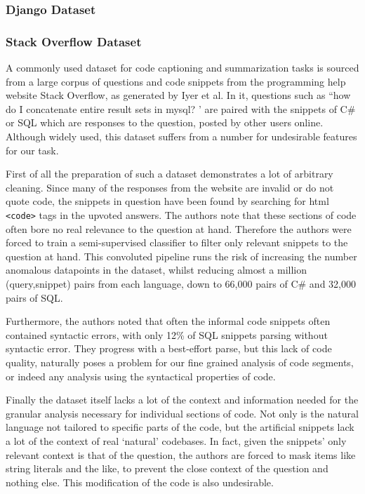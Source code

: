 \subsubsection{Django Dataset}



\subsubsection{Stack Overflow Dataset}

A commonly used dataset for code captioning and summarization tasks is sourced from a large corpus of questions and code snippets from the programming help website Stack Overflow, as generated by Iyer et al\cite{iyer_summarizing_2016}. In it, questions such as ``how do I concatenate entire result sets in mysql? ' are paired with the snippets of C\# or SQL which are responses to the question, posted by other users online.
Although widely used, this dataset suffers from a number for undesirable features for our task. 

First of all the preparation of such a dataset demonstrates a lot of arbitrary cleaning.
Since many of the responses from the website are invalid or do not quote code, the snippets in question have been found by searching for html \texttt{<code>} tags in the upvoted answers. 
The authors note that these sections of code often bore no real relevance to the question at hand. Therefore the authors were forced to train a semi-supervised classifier to filter only relevant snippets to the question at hand.
This convoluted pipeline runs the risk of increasing the number anomalous datapoints in the dataset, whilst reducing almost a million (query,snippet) pairs from each language, down to 66,000 pairs  of C\# and 32,000 pairs of SQL.

Furthermore, the authors noted that often the informal code snippets often contained syntactic errors, with only 12\% of SQL snippets parsing without syntactic error. They progress with a best-effort parse, but this
 lack of code quality, naturally poses a problem for our fine grained analysis of code segments, or indeed any analysis using the syntactical properties of code.

Finally the dataset itself lacks a lot of the context and information needed for the granular analysis necessary for individual sections of code. Not only is the natural language not tailored to specific parts of the code, but the artificial snippets lack a lot of the context of real `natural' codebases. In fact, given the snippets' only relevant context is that of the question, the authors are forced to mask items like string literals and the like, to prevent the close context of the question and nothing else. This modification of the code is also undesirable.

